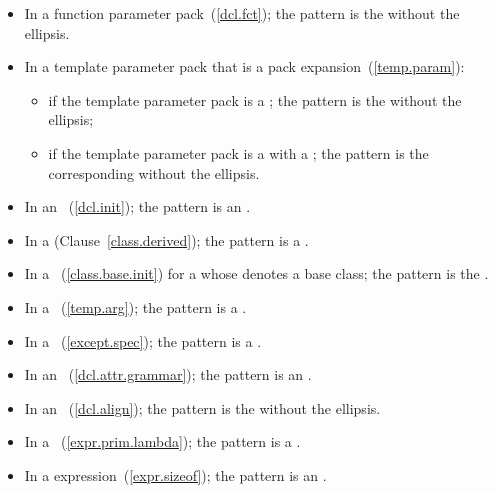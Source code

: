 \begin{itemize}
\item In a function parameter pack~(\ref{dcl.fct}); the pattern is the
 without the ellipsis.

\item In a template parameter pack that is a pack expansion~(\ref{temp.param}):

\begin{itemize}
\item if the template parameter pack is a ;
the pattern is the  without the ellipsis;

\item if the template parameter pack is a  with a
; the pattern is the corresponding
 without the ellipsis.
\end{itemize}

\item In an ~(\ref{dcl.init});
the pattern is an .

\item In a  (Clause~\ref{class.derived});
the pattern is a .

\item In a ~(\ref{class.base.init}) for a
 whose  denotes a
base class; the pattern is the .

\item In a ~(\ref{temp.arg});
the pattern is a .

\item In a ~(\ref{except.spec});
the pattern is a .

\item In an ~(\ref{dcl.attr.grammar}); the pattern is
an .

\item In an ~(\ref{dcl.align}); the pattern is
the  without the ellipsis.

\item In a ~(\ref{expr.prim.lambda}); the pattern is
a .

\item In a  expression~(\ref{expr.sizeof}); the pattern is an
.
\end{itemize}

